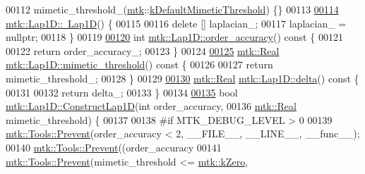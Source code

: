\begin{DoxyCode}
00112   mimetic\_threshold\_(\hyperlink{namespacemtk}{mtk}::\hyperlink{group__c01-roots_ga35718d949bdc81a08a9cc8ebbe3478a2}{kDefaultMimeticThreshold}) \{\}
00113 
\hypertarget{mtk__lap__1d_8cc_source_l00114}{}\hyperlink{classmtk_1_1Lap1D_ac0cb868243a66658cc46de5b818fa4e8}{00114} \hyperlink{classmtk_1_1Lap1D_ac0cb868243a66658cc46de5b818fa4e8}{mtk::Lap1D::~Lap1D}() \{
00115 
00116   \textcolor{keyword}{delete} [] laplacian\_;
00117   laplacian\_ = \textcolor{keyword}{nullptr};
00118 \}
00119 
\hypertarget{mtk__lap__1d_8cc_source_l00120}{}\hyperlink{classmtk_1_1Lap1D_ae3490534a9e950df3f81b3840c31b13a}{00120} \textcolor{keywordtype}{int} \hyperlink{classmtk_1_1Lap1D_ae3490534a9e950df3f81b3840c31b13a}{mtk::Lap1D::order\_accuracy}()\textcolor{keyword}{ const }\{
00121 
00122   \textcolor{keywordflow}{return} order\_accuracy\_;
00123 \}
00124 
\hypertarget{mtk__lap__1d_8cc_source_l00125}{}\hyperlink{classmtk_1_1Lap1D_a957ae4ff6053d605ac7b93650ad6f188}{00125} \hyperlink{group__c01-roots_gac080bbbf5cbb5502c9f00405f894857d}{mtk::Real} \hyperlink{classmtk_1_1Lap1D_a957ae4ff6053d605ac7b93650ad6f188}{mtk::Lap1D::mimetic\_threshold}()\textcolor{keyword}{ const }\{
00126 
00127   \textcolor{keywordflow}{return} mimetic\_threshold\_;
00128 \}
00129 
\hypertarget{mtk__lap__1d_8cc_source_l00130}{}\hyperlink{classmtk_1_1Lap1D_a4e16e80c6dd845ac42bda23385a1c56e}{00130} \hyperlink{group__c01-roots_gac080bbbf5cbb5502c9f00405f894857d}{mtk::Real} \hyperlink{classmtk_1_1Lap1D_a4e16e80c6dd845ac42bda23385a1c56e}{mtk::Lap1D::delta}()\textcolor{keyword}{ const }\{
00131 
00132   \textcolor{keywordflow}{return} delta\_;
00133 \}
00134 
\hypertarget{mtk__lap__1d_8cc_source_l00135}{}\hyperlink{classmtk_1_1Lap1D_a685dcba88c08cf5b7b6c2aa4669a472c}{00135} \textcolor{keywordtype}{bool} \hyperlink{classmtk_1_1Lap1D_a685dcba88c08cf5b7b6c2aa4669a472c}{mtk::Lap1D::ConstructLap1D}(\textcolor{keywordtype}{int} order\_accuracy,
00136                                 \hyperlink{group__c01-roots_gac080bbbf5cbb5502c9f00405f894857d}{mtk::Real} mimetic\_threshold) \{
00137 
00138 \textcolor{preprocessor}{  #if MTK\_DEBUG\_LEVEL > 0}
00139   \hyperlink{classmtk_1_1Tools_a332324c6f25e66be9dff48c5987a3b9f}{mtk::Tools::Prevent}(order\_accuracy < 2, \_\_FILE\_\_, \_\_LINE\_\_, \_\_func\_\_);
00140   \hyperlink{classmtk_1_1Tools_a332324c6f25e66be9dff48c5987a3b9f}{mtk::Tools::Prevent}((order\_accuracy%
00141   \hyperlink{classmtk_1_1Tools_a332324c6f25e66be9dff48c5987a3b9f}{mtk::Tools::Prevent}(mimetic\_threshold <= \hyperlink{group__c01-roots_ga59a451a5fae30d59649bcda274fea271}{mtk::kZero},

\end{DoxyCode}
